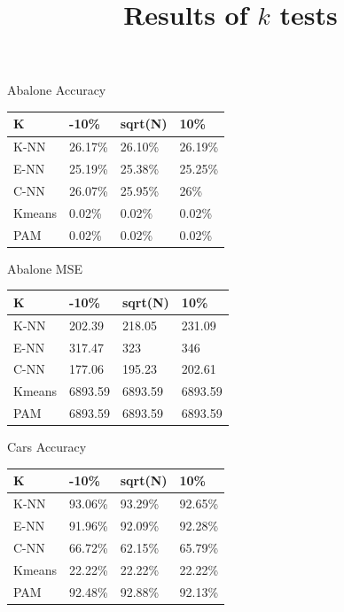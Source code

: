 \documentclass[twoside,11pt]{article}
\begin{document}
\begin{table}[ht]
	\title{Results of $k$ tests}
	\begin{minipage}[b]{0.45\linewidth}\centering
		Abalone Accuracy
		\begin{tabular}{llll}
			\hline
			K      & -10\%   & sqrt(N) & 10\%    \\ \hline
			K-NN   & 26.17\% & 26.10\% & 26.19\% \\
			E-NN   & 25.19\% & 25.38\% & 25.25\% \\
			C-NN   & 26.07\% & 25.95\% & 26\%    \\
			Kmeans & 0.02\%  & 0.02\%  & 0.02\%  \\
			PAM    & 0.02\%  & 0.02\%  & 0.02\%
		\end{tabular}
	\end{minipage}
	\hspace{0.5cm}\centering
	\begin{minipage}[b]{0.45\linewidth}
		Abalone MSE
		\centering
		\begin{tabular}{llll}
			\hline
			K      & -10\%   & sqrt(N) & 10\%    \\ \hline
			K-NN   & 202.39  & 218.05  & 231.09  \\
			E-NN   & 317.47  & 323     & 346     \\
			C-NN   & 177.06  & 195.23  & 202.61  \\
			Kmeans & 6893.59 & 6893.59 & 6893.59 \\
			PAM    & 6893.59 & 6893.59 & 6893.59
		\end{tabular}
	\end{minipage}
	\begin{minipage}[b]{0.45\linewidth}\centering
		Cars Accuracy
		\begin{tabular}{llll}
			\hline
			K      & -10\%   & sqrt(N) & 10\%    \\ \hline
			K-NN   & 93.06\% & 93.29\% & 92.65\% \\
			E-NN   & 91.96\% & 92.09\% & 92.28\% \\
			C-NN   & 66.72\% & 62.15\% & 65.79\% \\
			Kmeans & 22.22\% & 22.22\% & 22.22\% \\
			PAM    & 92.48\% & 92.88\% & 92.13\%
		\end{tabular}
	\end{minipage}
	\hspace{0.5cm}\centering
	\begin{minipage}[b]{0.45\linewidth}

\end{minipage}
\end{table}
\end{document}
